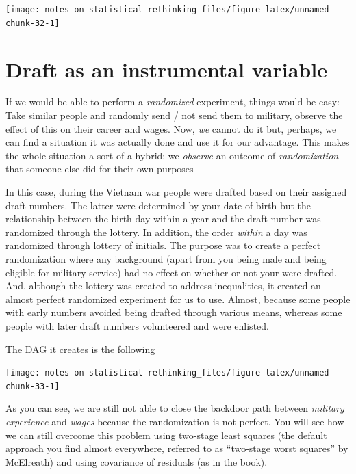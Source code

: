 \documentclass[
]{book}
\begin{document}
\begin{center}\texttt{[image: notes-on-statistical-rethinking\_files/figure-latex/unnamed-chunk-32-1]} \end{center}

\hypertarget{draft-as-an-instrumental-variable}{%
\section*{Draft as an instrumental variable}\label{draft-as-an-instrumental-variable}}

If we would be able to perform a \emph{randomized} experiment, things would be easy: Take similar people and randomly send / not send them to military, observe the effect of this on their career and wages. Now, \emph{we} cannot do it but, perhaps, we can find a situation it was actually done and use it for our advantage. This makes the whole situation a sort of a hybrid: we \emph{observe} an outcome of \emph{randomization} that someone else did for their own purposes

In this case, during the Vietnam war people were drafted based on their assigned draft numbers. The latter were determined by your date of birth but the relationship between the birth day within a year and the draft number was \href{https://en.wikipedia.org/wiki/Draft_lottery_(1969)}{randomized through the lottery}. In addition, the order \emph{within} a day was randomized through lottery of initials. The purpose was to create a perfect randomization where any background (apart from you being male and being eligible for military service) had no effect on whether or not your were drafted. And, although the lottery was created to address inequalities, it created an almost perfect randomized experiment for us to use. Almost, because some people with early numbers avoided being drafted through various means, whereas some people with later draft numbers volunteered and were enlisted.

The DAG it creates is the following

\begin{center}\texttt{[image: notes-on-statistical-rethinking\_files/figure-latex/unnamed-chunk-33-1]} \end{center}

As you can see, we are still not able to close the backdoor path between \emph{military experience} and \emph{wages} because the randomization is not perfect. You will see how we can still overcome this problem using two-stage least squares (the default approach you find almost everywhere, referred to as ``two-stage worst squares'' by McElreath) and using covariance of residuals (as in the book).
\end{document}
